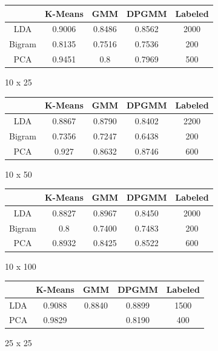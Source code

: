 \documentclass[11pt,a4paper]{article}
\begin{document}
	\begin{figure}
	\begin{center}
	\begin{tabular}{|c|c|c|c|c|}
		\hline
		 & K-Means & GMM & DPGMM & Labeled \\
		 \hline
		 LDA & 0.9006 & 0.8486 & 0.8562 & 2000 \\
		 \hline
		 Bigram & 0.8135 & 0.7516 & 0.7536 & 200 \\
		 \hline
		 PCA & 0.9451 & 0.8 & 0.7969 & 500 \\
		 \hline
	\end{tabular}
	\caption{10 x 25}
	\end{center}
	\end{figure}





	\begin{figure}
	\begin{center}
	\begin{tabular}{|c|c|c|c|c|}
		\hline
		 & K-Means & GMM & DPGMM & Labeled \\
		 \hline
		 LDA & 0.8867 & 0.8790 & 0.8402 & 2200 \\
		 \hline
		 Bigram & 0.7356 & 0.7247 & 0.6438 & 200 \\
		 \hline
		 PCA & 0.927 & 0.8632 & 0.8746 & 600 \\
		 \hline
	\end{tabular}
	\caption{10 x 50}
	\end{center}
	\end{figure}
	
	
	
	\begin{figure}
	\begin{center}
	\begin{tabular}{|c|c|c|c|c|}
		\hline
		 & K-Means & GMM & DPGMM & Labeled \\
		 \hline
		 LDA & 0.8827 & 0.8967 & 0.8450 & 2000 \\
		 \hline
		 Bigram & 0.8 & 0.7400 & 0.7483 & 200 \\
		 \hline
		 PCA & 0.8932 & 0.8425 & 0.8522 & 600 \\
		 \hline
	\end{tabular}
	\caption{10 x 100}
	\end{center}
	\end{figure}
	
	
	
	\begin{figure}
	\begin{center}
	\begin{tabular}{|c|c|c|c|c|}
		\hline
		 & K-Means & GMM & DPGMM & Labeled \\
		 \hline
		 LDA & 0.9088 & 0.8840 & 0.8899 & 1500 \\
		 \hline
		 PCA & 0.9829 & & 0.8190 & 400 \\
		 \hline
	\end{tabular}
	\caption{25 x 25}
	\end{center}
	\end{figure}
	
\end{document}
